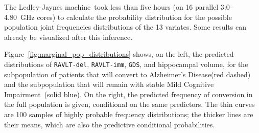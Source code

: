 \documentclass[utf8]{FrontiersinHarvard} %
\renewcommand*{\|}[1][]{\nonscript\:#1\vert\nonscript\:\mathopen{}}
\newcommand*{\gds}{\texttt{GDS}}
\newcommand*{\ravltimm}{\texttt{RAVLT-imm}}
\newcommand*{\ravltdel}{\texttt{RAVLT-del}}
\newcommand*{\ad}{Alzheimer's Disease}
\newcommand*{\mci}{Mild Cognitive Impairment}
\newcommand*{\ljm}{Ledley-Jaynes machine}
\begin{document}
The \ljm\ took less than five hours (on 16 parallel 3.0--4.80~GHz cores) to calculate the probability distribution for the possible population joint frequencies distributions of the 13 variates. Some results can already be visualized after this inference.

Figure~\ref{fig:marginal_pop_distributions} shows, on the left, the predicted distributions of \ravltdel, \ravltimm, \gds, and hippocampal volume, for the subpopulation of patients that will convert to \ad (red dashed) and the subpopulation that will remain with stable \mci\ (solid blue). On the right, the predicted frequency of conversion in the full population is given, conditional on the same predictors. The thin curves are 100 samples of highly probable frequency distributions; the thicker lines are their means, which are also the predictive conditional probabilities.
\end{document}
